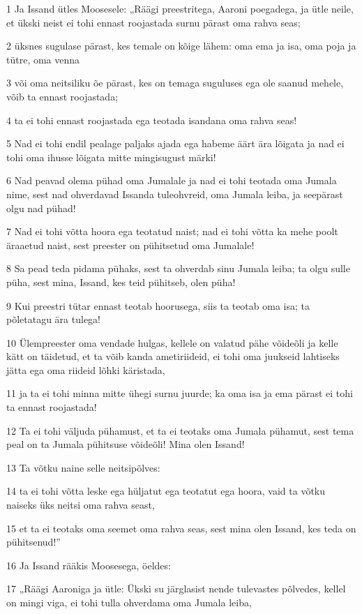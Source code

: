 \par 1 Ja Issand ütles Moosesele: „Räägi preestritega, Aaroni poegadega, ja ütle neile, et ükski neist ei tohi ennast roojastada surnu pärast oma rahva seas;
\par 2 üksnes sugulase pärast, kes temale on kõige lähem: oma ema ja isa, oma poja ja tütre, oma venna
\par 3 või oma neitsiliku õe pärast, kes on temaga suguluses ega ole saanud mehele, võib ta ennast roojastada;
\par 4 ta ei tohi ennast roojastada ega teotada isandana oma rahva seas!
\par 5 Nad ei tohi endil pealage paljaks ajada ega habeme äärt ära lõigata ja nad ei tohi oma ihusse lõigata mitte mingisugust märki!
\par 6 Nad peavad olema pühad oma Jumalale ja nad ei tohi teotada oma Jumala nime, sest nad ohverdavad Issanda tuleohvreid, oma Jumala leiba, ja seepärast olgu nad pühad!
\par 7 Nad ei tohi võtta hoora ega teotatud naist; nad ei tohi võtta ka mehe poolt äraaetud naist, sest preester on pühitsetud oma Jumalale!
\par 8 Sa pead teda pidama pühaks, sest ta ohverdab sinu Jumala leiba; ta olgu sulle püha, sest mina, Issand, kes teid pühitseb, olen püha!
\par 9 Kui preestri tütar ennast teotab hoorusega, siis ta teotab oma isa; ta põletatagu ära tulega!
\par 10 Ülempreester oma vendade hulgas, kellele on valatud pähe võideõli ja kelle kätt on täidetud, et ta võib kanda ametiriideid, ei tohi oma juukseid lahtiseks jätta ega oma riideid lõhki käristada,
\par 11 ja ta ei tohi minna mitte ühegi surnu juurde; ka oma isa ja ema pärast ei tohi ta ennast roojastada!
\par 12 Ta ei tohi väljuda pühamust, et ta ei teotaks oma Jumala pühamut, sest tema peal on ta Jumala pühitsuse võideõli! Mina olen Issand!
\par 13 Ta võtku naine selle neitsipõlves:
\par 14 ta ei tohi võtta leske ega hüljatut ega teotatut ega hoora, vaid ta võtku naiseks üks neitsi oma rahva seast,
\par 15 et ta ei teotaks oma seemet oma rahva seas, sest mina olen Issand, kes teda on pühitsenud!”
\par 16 Ja Issand rääkis Moosesega, öeldes:
\par 17 „Räägi Aaroniga ja ütle: Ükski su järglasist nende tulevastes põlvedes, kellel on mingi viga, ei tohi tulla ohverdama oma Jumala leiba,
